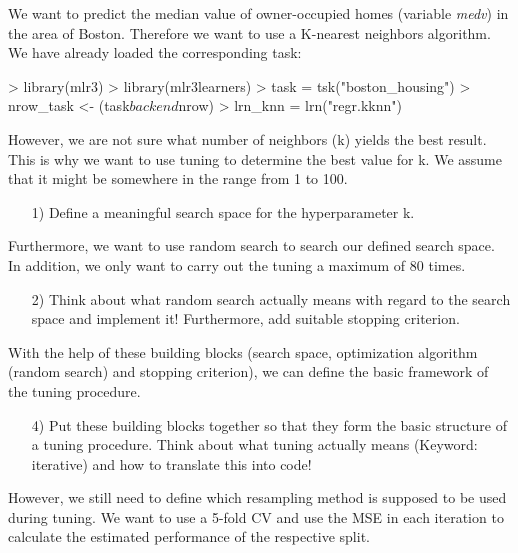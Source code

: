 We want to predict the median value of owner-occupied homes
(variable \textit{medv}) in the area of Boston. Therefore
we want to use a K-nearest neighbors algorithm. We have already loaded the
corresponding task:

\begin{Schunk}
\begin{Sinput}
> library(mlr3)
> library(mlr3learners)
> task = tsk("boston_housing")
> nrow_task <- (task$backend$nrow)
> lrn_knn = lrn("regr.kknn")
\end{Sinput}
\end{Schunk}

However, we are not sure what number of neighbors (k) yields the best result.
This is why we want to use tuning to determine the best value for k.
We assume that it might be somewhere in the range from 1 to 100.

\begin{enumerate}\bfseries
  \item[1)] Define a meaningful search space for the hyperparameter k.
\end{enumerate}

Furthermore, we want to use random search to search our defined search space.
In addition, we only want to carry out the tuning a maximum of 80 times.

\begin{enumerate}\bfseries
  \item[2)] Think about what random search actually means with regard to the
  search space and implement it! Furthermore, add suitable stopping criterion.
\end{enumerate}

With the help of these building blocks (search space, optimization algorithm
(random search) and stopping criterion), we can define the basic
framework of the tuning procedure.

\begin{enumerate}\bfseries
  \item[4)] Put these building blocks together so that they form the basic
  structure of a tuning procedure. Think about what tuning actually means (Keyword: iterative) and how
  to translate this into code!
\end{enumerate}

However, we still need to define which resampling method is supposed to be used
during tuning. We want to use a 5-fold CV and use the MSE in each iteration to
calculate the estimated performance of the respective split.

